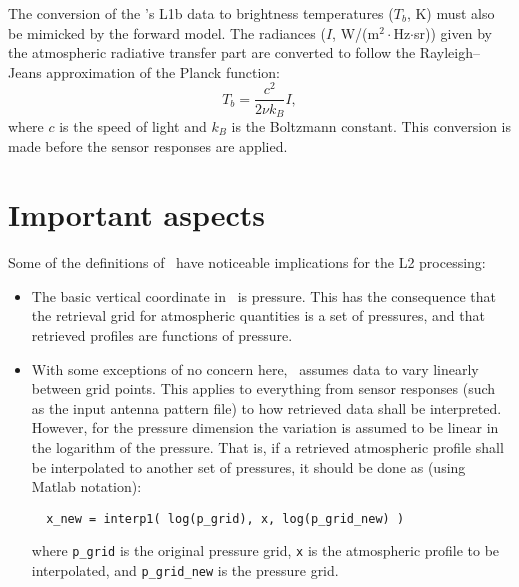 The conversion of the \smr's L1b data to brightness temperatures ($T_b$, K)
must also be mimicked by the forward model. The radiances ($I$,
W/(m$^2\cdot$Hz$\cdot$sr)) given by the atmospheric radiative transfer part are
converted to follow the Rayleigh--Jeans approximation of the Planck function:
\begin{equation}
  \label{eq:i2tb}
  T_b = \frac{c^2}{2\nu k_B} I,
\end{equation}
where $c$ is the speed of light and $k_B$ is the Boltzmann constant. This
conversion is made before the sensor responses are applied.



\section{Important aspects}
\label{sec:arts:aspects}
%
Some of the definitions of \ARTS\ have noticeable implications for the
L2 processing:
\begin{itemize}
\item The basic vertical coordinate in \ARTS\ is pressure. This has the
  consequence that the retrieval grid for atmospheric quantities is a set of
  pressures, and that retrieved profiles are functions of pressure.
\item With some exceptions of no concern here, \ARTS\ assumes data to vary
  linearly between grid points. This applies to everything from sensor responses
  (such as the input antenna pattern file) to how retrieved data shall be
  interpreted. However, for the pressure dimension the variation is assumed to
  be linear in the logarithm of the pressure. That is, if a retrieved
  atmospheric profile shall be interpolated to another set of pressures, it
  should be done as (using Matlab notation):
\begin{verbatim}
  x_new = interp1( log(p_grid), x, log(p_grid_new) )
\end{verbatim}
where \verb|p_grid| is the original pressure grid, \verb|x| is the atmospheric
profile to be interpolated, and \verb|p_grid_new| is the pressure grid.
\end{itemize}



